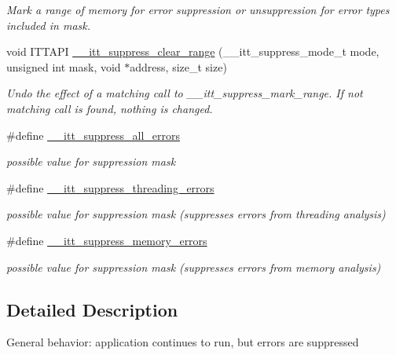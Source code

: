 \begin{DoxyCompactItemize}
\begin{DoxyCompactList}\small\item\em Mark a range of memory for error suppression or unsuppression for error types included in mask. \end{DoxyCompactList}\item 
\hypertarget{group__suppress_gacfd9cea63c4b07bb44215785ec882583}{}void I\+T\+T\+A\+P\+I \hyperlink{group__suppress_gacfd9cea63c4b07bb44215785ec882583}{\+\_\+\+\_\+itt\+\_\+suppress\+\_\+clear\+\_\+range} (\+\_\+\+\_\+itt\+\_\+suppress\+\_\+mode\+\_\+t mode, unsigned int mask, void $\ast$address, size\+\_\+t size)\label{group__suppress_gacfd9cea63c4b07bb44215785ec882583}

\begin{DoxyCompactList}\small\item\em Undo the effect of a matching call to \+\_\+\+\_\+itt\+\_\+suppress\+\_\+mark\+\_\+range. If not matching call is found, nothing is changed. \end{DoxyCompactList}\item 
\hypertarget{group__suppress_ga3900b5fa67bc34ea6d9cd9f13626c7a8}{}\#define \hyperlink{group__suppress_ga3900b5fa67bc34ea6d9cd9f13626c7a8}{\+\_\+\+\_\+itt\+\_\+suppress\+\_\+all\+\_\+errors}\label{group__suppress_ga3900b5fa67bc34ea6d9cd9f13626c7a8}

\begin{DoxyCompactList}\small\item\em possible value for suppression mask \end{DoxyCompactList}\item 
\hypertarget{group__suppress_gaef282c38d1dd1bdd62faa58a59936f34}{}\#define \hyperlink{group__suppress_gaef282c38d1dd1bdd62faa58a59936f34}{\+\_\+\+\_\+itt\+\_\+suppress\+\_\+threading\+\_\+errors}\label{group__suppress_gaef282c38d1dd1bdd62faa58a59936f34}

\begin{DoxyCompactList}\small\item\em possible value for suppression mask (suppresses errors from threading analysis) \end{DoxyCompactList}\item 
\hypertarget{group__suppress_gacb8880266f3c9716e202a9a6b1e0fa63}{}\#define \hyperlink{group__suppress_gacb8880266f3c9716e202a9a6b1e0fa63}{\+\_\+\+\_\+itt\+\_\+suppress\+\_\+memory\+\_\+errors}\label{group__suppress_gacb8880266f3c9716e202a9a6b1e0fa63}

\begin{DoxyCompactList}\small\item\em possible value for suppression mask (suppresses errors from memory analysis) \end{DoxyCompactList}\end{DoxyCompactItemize}


\subsection{Detailed Description}
General behavior\+: application continues to run, but errors are suppressed 